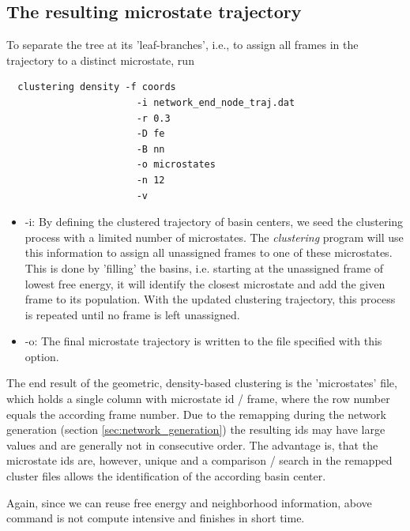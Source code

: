\documentclass[12pt,a4paper,twoside,english,fleqn]{article}
\begin{document}
\subsection{The resulting microstate trajectory}
To separate the tree at its 'leaf-branches', i.e., to assign all frames in the
trajectory to a distinct microstate, run
\begin{lstlisting}
  clustering density -f coords
                       -i network_end_node_traj.dat
                       -r 0.3
                       -D fe
                       -B nn
                       -o microstates
                       -n 12
                       -v
\end{lstlisting}

\begin{itemize}
  \item -i: By defining the clustered trajectory of basin centers, we seed the
            clustering process with a limited number of microstates.
            The \emph{clustering} program will use this information to assign
            all unassigned frames to one of these microstates.
            This is done by 'filling' the basins, i.e. starting at the
            unassigned frame of lowest free energy, it will identify the
            closest microstate and add the given frame to its population.
            With the updated clustering trajectory, this process is repeated
            until no frame is left unassigned.
  \item -o: The final microstate trajectory is written to the file specified
            with this option.
\end{itemize}

The end result of the geometric, density-based clustering is the 'microstates'
file, which holds a single column with microstate id / frame, where the row
number equals the according frame number. Due to the remapping during the
network generation (section \ref{sec:network_generation}) the resulting ids
may have large values and are generally not in consecutive order.
The advantage is, that the microstate ids are, however, unique and a
comparison / search in the remapped cluster files allows the identification of
the according basin center.


\begin{mdframed}[innertopmargin=20pt]
  Again, since we can reuse free energy and neighborhood information, above
  command is not compute intensive and finishes in short time.
\end{mdframed}
\end{document}

